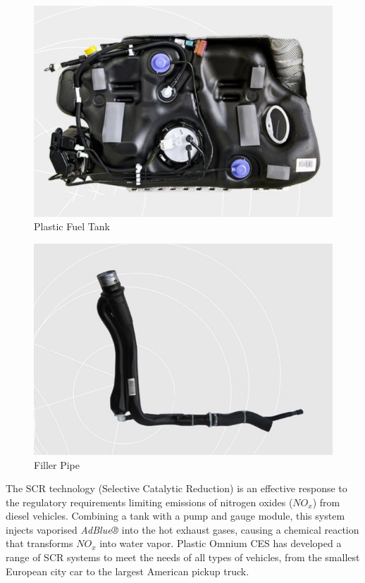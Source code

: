 \begin{figure}
\centerline{\includegraphics[scale=0.6]{images/appendix_A/Plastic_fuel_tank.png}}
\caption{Plastic Fuel Tank}
\label{fig:Plastic Fuel Tank}
\end{figure}
\begin{figure}
\centerline{\includegraphics[scale=0.6]{images/appendix_A/Filler_pipe.png}}
\caption{Filler Pipe}
\label{fig:Filler Pipe}
\end{figure}

The SCR technology (Selective Catalytic Reduction) is an effective response to the regulatory requirements limiting emissions of nitrogen oxides ($NO_x$) from diesel vehicles. Combining a tank with a pump and gauge module, this system injects vaporised \textit{AdBlue®} into the hot exhaust gases, causing a chemical reaction that transforms $NO_x$ into water vapor. Plastic Omnium CES has developed a range of SCR systems to meet the needs of all types of vehicles, from the smallest European city car to the largest American pickup truck.